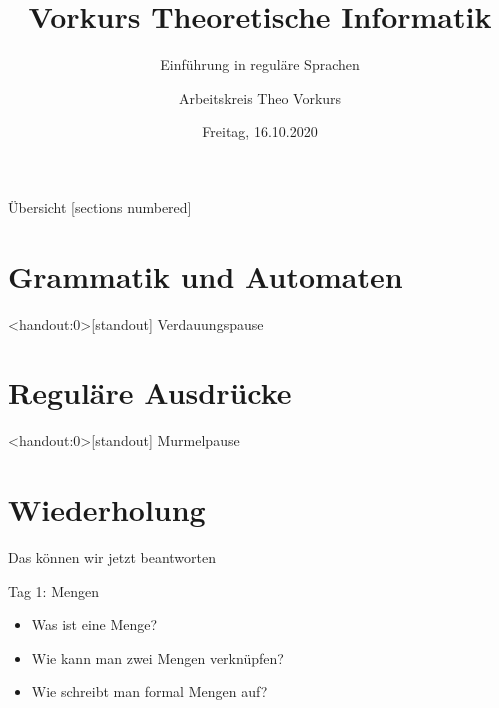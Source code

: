 

\title{Vorkurs Theoretische Informatik}
\subtitle{Einführung in reguläre Sprachen}
\date{Freitag, 16.10.2020}
\author{Arbeitskreis  Theo Vorkurs}



\maketitle

\begin{frame}[fragile]{Übersicht}
  [sections numbered]
  \tableofcontents%
\end{frame}


\section{Grammatik und Automaten}



\begin{frame}<handout:0>[standout]
  Verdauungspause
\end{frame}

\section{Reguläre Ausdrücke}



\begin{frame}<handout:0>[standout]
  Murmelpause
\end{frame}

\section{Wiederholung}
\begin{frame}[fragile]{Das können wir jetzt beantworten}
  \begin{alertblock}{Tag 1: Mengen}
    \begin{itemize}
      \item Was ist eine Menge?
      \item Wie kann man zwei Mengen verknüpfen?
      \item Wie schreibt man formal Mengen auf?
    \end{itemize}
  \end{alertblock}
\end{frame}

